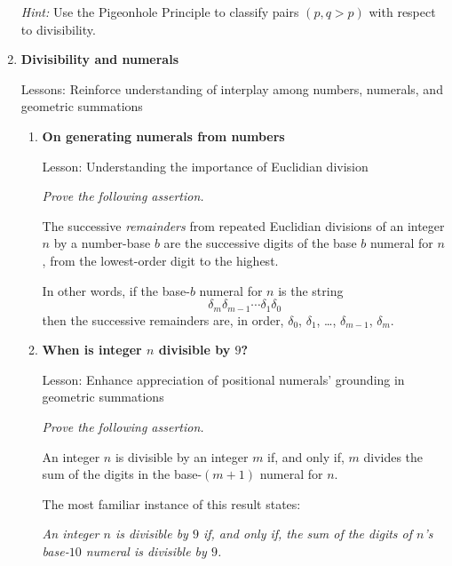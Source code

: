 \begin{enumerate}
\smallskip

\textit{Hint:}
Use the Pigeonhole Principle to classify pairs $(p, q > p)$ with respect to divisibility.

\medskip\item
{\bf Divisibility and numerals}

{\sc Lessons:} Reinforce understanding of interplay among numbers, numerals, and geometric summations

   \begin{enumerate}
   \item
{\bf On generating numerals from numbers}

{\sc Lesson:} Understanding the importance of Euclidian division

\smallskip

{\em Prove the following assertion.}

\begin{prop}
The successive {\em remainders} from repeated Euclidian divisions of an integer $n$ by a number-base $b$ are the successive digits of the base $b$ numeral for $n$, from the lowest-order digit to the highest.
\end{prop}

\smallskip

In other words, if the base-$b$ numeral for $n$ is the string
\[ \delta_m \delta_{m-1}  \cdots \delta_1 \delta_0 \]
then the successive remainders are, in order, $\delta_0$, $\delta_1$, \ldots, $\delta_{m-1}$,
$\delta_m$.

   \medskip\item
{\bf When is integer $n$ divisible by $9$?}

{\sc Lesson:} Enhance appreciation of positional numerals' grounding in geometric summations

\smallskip

{\em Prove the following assertion.}

\begin{prop}
An integer $n$ is divisible by an integer $m$ if, and only if, $m$ divides the sum of the digits in the base-$(m+1)$ numeral for $n$.
\end{prop}

\smallskip

The most familiar instance of this result states:

{\it An integer $n$ is divisible by $9$ if, and only if, the sum of the digits of $n$'s base-$10$ numeral is divisible by $9$.}

\smallskip


\end{enumerate}
\end{enumerate}
